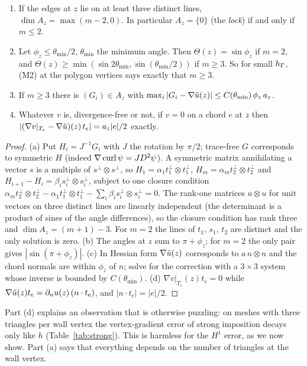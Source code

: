 \begin{lemma}\label{lem:st:local}
\begin{enumerate}[label=(\alph*)]
\item If the edges at $z$ lie on at least three distinct lines, $\dim A_z=\max(m-2,0)$. In particular $A_z=\{0\}$ (the \emph{lock}) if and only if $m\le2$.
\item Let $\phi_z\le\theta_{\min}/2$, $\theta_{\min}$ the minimum angle. Then $\Theta(z)=\sin\phi_z$ if $m=2$, and $\Theta(z)\ge\min(\sin2\theta_{\min},\sin(\theta_{\min}/2))$ if $m\ge3$. So for small $h_\Gamma$, (M2) at the polygon vertices says exactly that $m\ge3$.
\item If $m\ge3$ there is $(G_i)\in A_z$ with $\max_i|G_i-\nabla\tilde u(z)|\le C(\theta_{\min})\,\phi_z\,a_z$.
\item Whatever $v$ is, divergence-free or not, if $v=0$ on a chord $e$ at $z$ then $|(\nabla v|_{T_e}-\nabla\tilde u)(z)\,t_e|=a_z|e|/2$ exactly.
\end{enumerate}
\end{lemma}

\begin{proof}
(a) Put $H_i=J^{-1}G_i$ with $J$ the rotation by $\pi/2$; trace-free $G$ corresponds to symmetric $H$ (indeed $\nabla\operatorname{curl}\psi=JD^2\psi$). A symmetric matrix annihilating a vector $s$ is a multiple of $s^\perp\otimes s^\perp$, so $H_1=\alpha_1t_1^\perp\otimes t_1^\perp$, $H_m=\alpha_mt_2^\perp\otimes t_2^\perp$ and $H_{i+1}-H_i=\beta_is_i^\perp\otimes s_i^\perp$, subject to one closure condition $\alpha_mt_2^\perp\otimes t_2^\perp-\alpha_1t_1^\perp\otimes t_1^\perp-\sum_i\beta_is_i^\perp\otimes s_i^\perp=0$. The rank-one matrices $u\otimes u$ for unit vectors on three distinct lines are linearly independent (the determinant is a product of sines of the angle differences), so the closure condition has rank three and $\dim A_z=(m+1)-3$. For $m=2$ the lines of $t_1$, $s_1$, $t_2$ are distinct and the only solution is zero. (b) The angles at $z$ sum to $\pi+\phi_z$; for $m=2$ the only pair gives $|\sin(\pi+\phi_z)|$. (c) In Hessian form $\nabla\tilde u(z)$ corresponds to $a\,n\otimes n$ and the chord normals are within $\phi_z$ of $n$; solve for the correction with a $3\times3$ system whose inverse is bounded by $C(\theta_{\min})$. (d) $\nabla v|_{T_e}(z)t_e=0$ while $\nabla\tilde u(z)t_e=\partial_n u(z)\,(n\cdot t_e)$, and $|n\cdot t_e|=|e|/2$.
\end{proof}

Part (d) explains an observation that is otherwise puzzling: on meshes with three triangles per wall vertex the vertex-gradient error of strong imposition decays only like $h$ (Table~\ref{tab:strong}). This is harmless for the $H^1$ error, as we now show. Part (a) says that everything depends on the number of triangles at the wall vertex.

